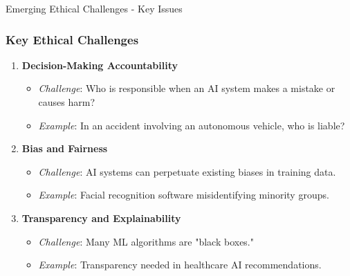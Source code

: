 \documentclass[aspectratio=169]{beamer}
\begin{document}
\begin{frame}[fragile]{Emerging Ethical Challenges - Key Issues}
    \frametitle{Key Ethical Challenges}
    \begin{enumerate}
        \item \textbf{Decision-Making Accountability}
            \begin{itemize}
                \item \textit{Challenge}: Who is responsible when an AI system makes a mistake or causes harm?
                \item \textit{Example}: In an accident involving an autonomous vehicle, who is liable?
            \end{itemize}
        
        \item \textbf{Bias and Fairness}
            \begin{itemize}
                \item \textit{Challenge}: AI systems can perpetuate existing biases in training data.
                \item \textit{Example}: Facial recognition software misidentifying minority groups.
            \end{itemize}
        
        \item \textbf{Transparency and Explainability}
            \begin{itemize}
                \item \textit{Challenge}: Many ML algorithms are "black boxes."
                \item \textit{Example}: Transparency needed in healthcare AI recommendations.
            \end{itemize}
    \end{enumerate}
\end{frame}
\end{document}
